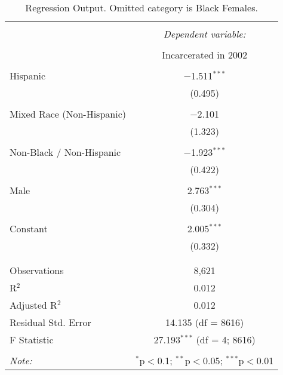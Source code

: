 
\begin{table}[!htbp] \centering 
  \caption{Regression Output. Omitted category is Black Females.} 
  \label{tab:regression} 
\begin{tabular}{@{\extracolsep{5pt}}lc} 
\\[-1.8ex]\hline 
\hline \\[-1.8ex] 
 & \multicolumn{1}{c}{\textit{Dependent variable:}} \\ 
\cline{2-2} 
\\[-1.8ex] & Incarcerated in 2002 \\ 
\hline \\[-1.8ex] 
 Hispanic & $-$1.511$^{***}$ \\ 
  & (0.495) \\ 
  & \\ 
 Mixed Race (Non-Hispanic) & $-$2.101 \\ 
  & (1.323) \\ 
  & \\ 
 Non-Black / Non-Hispanic & $-$1.923$^{***}$ \\ 
  & (0.422) \\ 
  & \\ 
 Male & 2.763$^{***}$ \\ 
  & (0.304) \\ 
  & \\ 
 Constant & 2.005$^{***}$ \\ 
  & (0.332) \\ 
  & \\ 
\hline \\[-1.8ex] 
Observations & 8,621 \\ 
R$^{2}$ & 0.012 \\ 
Adjusted R$^{2}$ & 0.012 \\ 
Residual Std. Error & 14.135 (df = 8616) \\ 
F Statistic & 27.193$^{***}$ (df = 4; 8616) \\ 
\hline 
\hline \\[-1.8ex] 
\textit{Note:}  & \multicolumn{1}{r}{$^{*}$p$<$0.1; $^{**}$p$<$0.05; $^{***}$p$<$0.01} \\ 
\end{tabular} 
\end{table} 
